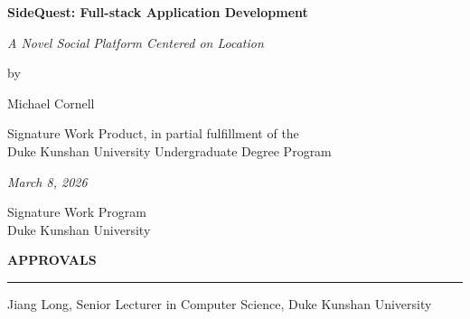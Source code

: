 \documentclass[12pt,a4paper,oneside]{report}
\begin{document}
\newcommand{\authorname}{Michael Cornell}

\newcommand{\thetitle}{SideQuest: Full-stack Application Development}
\newcommand{\thesubtitle}{\textit{A Novel Social Platform Centered on Location}}

\newcommand{\submissiondate}{March 8, 2026}

\newcommand{\mentor}{Jiang Long}

\newcommand{\comentor}{}

\newcommand{\academicunit}{Senior Lecturer in Computer Science, Duke Kunshan University}
\newcommand{\programunit}{Duke Kunshan University}

\begin{titlepage}

\vspace*{\bigskipamount}

\begin{center}

{\sffamily\LARGE\bfseries\MakeUppercase\thetitle\par}
{\large\itshape \thesubtitle\par}
\bigskip

\bigskip
by
\bigskip

{\Large \authorname}

\bigskip

Signature Work Product, in partial fulfillment of the \\
Duke Kunshan University Undergraduate Degree Program

\bigskip
\emph{\submissiondate}
\bigskip

Signature Work Program \\
Duke Kunshan University

\end{center}

\vfill

\textbf{\textsf{APPROVALS}}

\bigskip\bigskip\bigskip
\hrule
\mentor, \academicunit


\end{titlepage}
\end{document}
